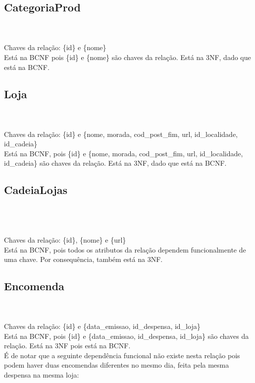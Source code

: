 \documentclass{report}
\begin{document}
\subsection{CategoriaProd}
\\
\\
\newline
Chaves da relação: \{id\} e \{nome\}\\
Está na BCNF pois \{id\} e \{nome\} são chaves da relação. Está na 3NF,
dado que está na BCNF.

\subsection{Loja}
\\
\\
\newline
Chaves da relação: \{id\} e \{nome, morada, cod\_post\_fim, url,
id\_localidade, id\_cadeia\}\\
Está na BCNF, pois \{id\} e \{nome, morada, cod\_post\_fim, url,
id\_localidade, id\_cadeia\} são chaves da relação. Está na 3NF,
dado que está na BCNF.

\subsection{CadeiaLojas}
\\
\\
\\
\newline
Chaves da relação: \{id\}, \{nome\} e \{url\}\\
Está na BCNF, pois todos os atributos da relação dependem funcionalmente
de uma chave. Por consequência, também está na 3NF.

\subsection{Encomenda}
\\
\\
\newline
Chaves da relação: \{id\} e \{data\_emissao, id\_despensa, id\_loja\}\\
Está na BCNF, pois \{id\} e \{data\_emissao, id\_despensa, id\_loja\} são
chaves da relação. Está na 3NF pois está na BCNF.\\
É de notar que a seguinte dependência funcional não existe nesta relação
pois podem haver duas encomendas diferentes no mesmo dia, feita pela mesma
despensa na mesma loja:\\
\end{document}
